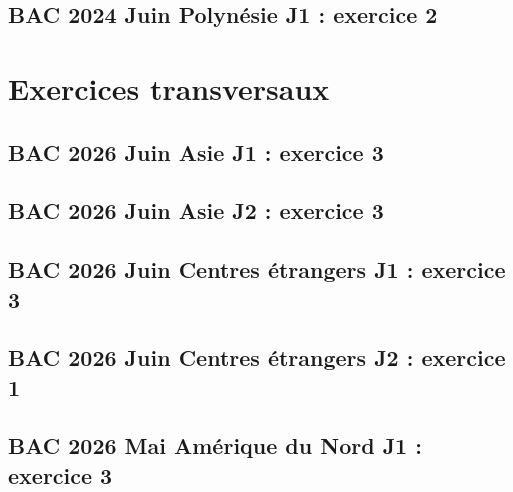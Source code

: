 \documentclass[lang=fr,edition=teacher,layout=sheet]{mxbook}
\begin{document}
\begingroup\endgroup
\par\bigskip
{}\subsection*{BAC 2024 Juin Polynésie J1 : exercice 2}
\begingroup\endgroup
\par\bigskip
\clearpage\section*{Exercices transversaux}
\subsection*{BAC 2026 Juin Asie J1 : exercice 3}
\begingroup\endgroup
\par\bigskip
{}\subsection*{BAC 2026 Juin Asie J2 : exercice 3}
\begingroup\endgroup
\par\bigskip
{}\subsection*{BAC 2026 Juin Centres étrangers J1 : exercice 3}
\begingroup\endgroup
\par\bigskip
{}\subsection*{BAC 2026 Juin Centres étrangers J2 : exercice 1}
\begingroup\endgroup
\par\bigskip
{}\subsection*{BAC 2026 Mai Amérique du Nord J1 : exercice 3}
\begingroup\endgroup
\end{document}
